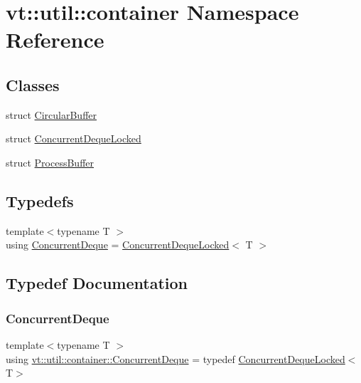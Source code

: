 \hypertarget{namespacevt_1_1util_1_1container}{}\section{vt\+:\+:util\+:\+:container Namespace Reference}
\label{namespacevt_1_1util_1_1container}
\subsection*{Classes}
\begin{DoxyCompactItemize}
\item 
struct \hyperlink{structvt_1_1util_1_1container_1_1_circular_buffer}{Circular\+Buffer}
\item 
struct \hyperlink{structvt_1_1util_1_1container_1_1_concurrent_deque_locked}{Concurrent\+Deque\+Locked}
\item 
struct \hyperlink{structvt_1_1util_1_1container_1_1_process_buffer}{Process\+Buffer}
\end{DoxyCompactItemize}
\subsection*{Typedefs}
\begin{DoxyCompactItemize}
\item 
{\footnotesize template$<$typename T $>$ }\\using \hyperlink{namespacevt_1_1util_1_1container_a495a137e297e892f4e474d4aaad77c8a}{Concurrent\+Deque} = \hyperlink{structvt_1_1util_1_1container_1_1_concurrent_deque_locked}{Concurrent\+Deque\+Locked}$<$ T $>$
\end{DoxyCompactItemize}


\subsection{Typedef Documentation}
\mbox{\label{namespacevt_1_1util_1_1container_a495a137e297e892f4e474d4aaad77c8a}} 
\subsubsection{\texorpdfstring{Concurrent\+Deque}{ConcurrentDeque}}
{\footnotesize\ttfamily template$<$typename T $>$ \\
using \hyperlink{namespacevt_1_1util_1_1container_a495a137e297e892f4e474d4aaad77c8a}{vt\+::util\+::container\+::\+Concurrent\+Deque} = typedef \hyperlink{structvt_1_1util_1_1container_1_1_concurrent_deque_locked}{Concurrent\+Deque\+Locked}$<$T$>$}

